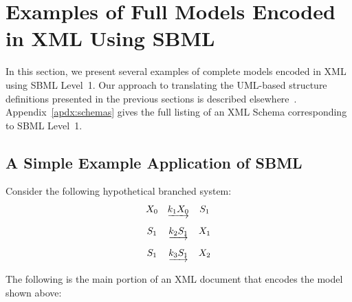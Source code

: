 \documentclass[10pt]{cekarticle}
\begin{document}
\section{Examples of Full Models Encoded in XML Using SBML}
\label{sec:xml-rep}

In this section, we present several examples of complete models encoded in
XML using SBML Level~1.  Our approach to translating the UML-based
structure definitions presented in the previous sections is described
elsewhere~\citep{hucka:2000b}.  Appendix~\ref{apdx:schemas} gives the full
listing of an XML Schema corresponding to SBML Level~1.


\subsection{A Simple Example Application of SBML}

Consider the following hypothetical branched system:
\begin{equation*}
  \begin{array}{@{}ccc@{}}
    X_0 & \underrightarrow{k_1 X_0} & S_1 \\ \\[-4pt]
    S_1 & \underrightarrow{k_2 S_1} & X_1 \\ \\[-4pt]
    S_1 & \underrightarrow{k_3 S_1} & X_2
  \end{array}
\end{equation*}

The following is the main portion of an XML document that encodes the model
shown above:

\newpage
\end{document}
